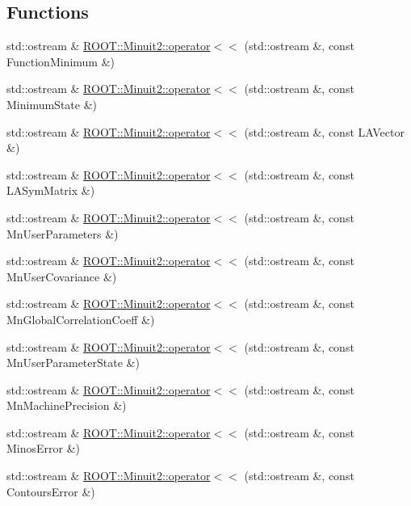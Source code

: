 \subsection*{Functions}
\begin{DoxyCompactItemize}
\item 
std\+::ostream \& \mbox{\hyperlink{namespaceROOT_1_1Minuit2_a38083dea2c583232d8c33ed056b555ef}{R\+O\+O\+T\+::\+Minuit2\+::operator$<$$<$}} (std\+::ostream \&, const Function\+Minimum \&)
\item 
std\+::ostream \& \mbox{\hyperlink{namespaceROOT_1_1Minuit2_a172c627b1d5fd6191ca54f94090cd304}{R\+O\+O\+T\+::\+Minuit2\+::operator$<$$<$}} (std\+::ostream \&, const Minimum\+State \&)
\item 
std\+::ostream \& \mbox{\hyperlink{namespaceROOT_1_1Minuit2_a687e586a693320c3d638977d002a9e50}{R\+O\+O\+T\+::\+Minuit2\+::operator$<$$<$}} (std\+::ostream \&, const L\+A\+Vector \&)
\item 
std\+::ostream \& \mbox{\hyperlink{namespaceROOT_1_1Minuit2_a37c2d73b40109f988c5ea59e1edf1f8d}{R\+O\+O\+T\+::\+Minuit2\+::operator$<$$<$}} (std\+::ostream \&, const L\+A\+Sym\+Matrix \&)
\item 
std\+::ostream \& \mbox{\hyperlink{namespaceROOT_1_1Minuit2_a950e1e56f48df042ba519464bda3f1ea}{R\+O\+O\+T\+::\+Minuit2\+::operator$<$$<$}} (std\+::ostream \&, const Mn\+User\+Parameters \&)
\item 
std\+::ostream \& \mbox{\hyperlink{namespaceROOT_1_1Minuit2_ab0d367617b39c46b8b0eeef75ecc5b75}{R\+O\+O\+T\+::\+Minuit2\+::operator$<$$<$}} (std\+::ostream \&, const Mn\+User\+Covariance \&)
\item 
std\+::ostream \& \mbox{\hyperlink{namespaceROOT_1_1Minuit2_ad8fa7aff1b1b2645f8b2a9c9a2231252}{R\+O\+O\+T\+::\+Minuit2\+::operator$<$$<$}} (std\+::ostream \&, const Mn\+Global\+Correlation\+Coeff \&)
\item 
std\+::ostream \& \mbox{\hyperlink{namespaceROOT_1_1Minuit2_a30dd5b9978bba19603bb3fb0f7427ddc}{R\+O\+O\+T\+::\+Minuit2\+::operator$<$$<$}} (std\+::ostream \&, const Mn\+User\+Parameter\+State \&)
\item 
std\+::ostream \& \mbox{\hyperlink{namespaceROOT_1_1Minuit2_a490766f2dd62363c6729e716a8da5da8}{R\+O\+O\+T\+::\+Minuit2\+::operator$<$$<$}} (std\+::ostream \&, const Mn\+Machine\+Precision \&)
\item 
std\+::ostream \& \mbox{\hyperlink{namespaceROOT_1_1Minuit2_a21121467830697f28cd9d979108c44dd}{R\+O\+O\+T\+::\+Minuit2\+::operator$<$$<$}} (std\+::ostream \&, const Minos\+Error \&)
\item 
std\+::ostream \& \mbox{\hyperlink{namespaceROOT_1_1Minuit2_a5f32b6f73f8b284fbc74fbf211a7b4ac}{R\+O\+O\+T\+::\+Minuit2\+::operator$<$$<$}} (std\+::ostream \&, const Contours\+Error \&)
\end{DoxyCompactItemize}


